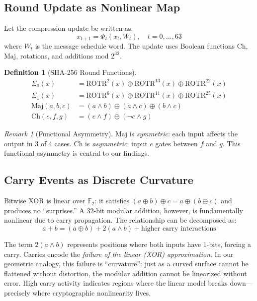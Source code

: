 \documentclass[11pt,a4paper]{article}
\theoremstyle{plain}
\theoremstyle{definition}
\newtheorem{definition}[theorem]{Definition}
\theoremstyle{remark}
\newtheorem{remark}[theorem]{Remark}
\newcommand{\Maj}{\mathrm{Maj}}
\newcommand{\Ch}{\mathrm{Ch}}
\newcommand{\rotr}{\mathrm{ROTR}}
\begin{document}
\subsection{Round Update as Nonlinear Map}

Let the compression update be written as:
\begin{equation}
    x_{t+1} = \Phi_t(x_t, W_t), \quad t = 0, \ldots, 63
\end{equation}
where $W_t$ is the message schedule word. The update uses Boolean functions $\Ch$, $\Maj$, rotations, and additions mod $2^{32}$.

\begin{definition}[SHA-256 Round Functions]
\begin{align}
    \Sigma_0(x) &= \rotr^2(x) \oplus \rotr^{13}(x) \oplus \rotr^{22}(x) \\
    \Sigma_1(x) &= \rotr^6(x) \oplus \rotr^{11}(x) \oplus \rotr^{25}(x) \\
    \Maj(a,b,c) &= (a \land b) \oplus (a \land c) \oplus (b \land c) \\
    \Ch(e,f,g) &= (e \land f) \oplus (\neg e \land g)
\end{align}
\end{definition}

\begin{remark}[Functional Asymmetry]
$\Maj$ is \emph{symmetric}: each input affects the output in 3 of 4 cases. $\Ch$ is \emph{asymmetric}: input $e$ gates between $f$ and $g$. This functional asymmetry is central to our findings.
\end{remark}

\subsection{Carry Events as Discrete Curvature}

Bitwise XOR is linear over $\mathbb{F}_2$: it satisfies $(a \oplus b) \oplus c = a \oplus (b \oplus c)$ and produces no ``surprises.'' A 32-bit modular addition, however, is fundamentally nonlinear due to carry propagation. The relationship can be decomposed as:
\begin{equation}
    a + b = (a \oplus b) + 2(a \land b) + \text{higher carry interactions}
\end{equation}

The term $2(a \land b)$ represents positions where both inputs have 1-bits, forcing a carry. Carries encode the \emph{failure of the linear (XOR) approximation}. In our geometric analogy, this failure is ``curvature'': just as a curved surface cannot be flattened without distortion, the modular addition cannot be linearized without error. High carry activity indicates regions where the linear model breaks down---precisely where cryptographic nonlinearity lives.
\end{document}
